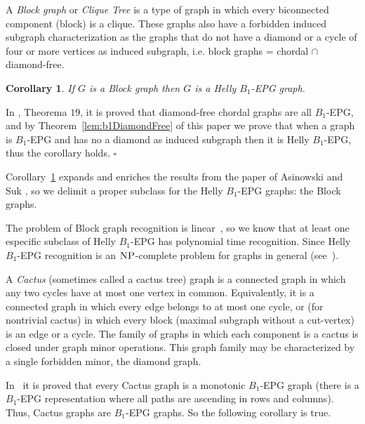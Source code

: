 \documentclass[9pt]{entcs}
\newtheorem{coro}{Corollary}[section]
\begin{document}
A \textit{Block graph} or \textit{Clique Tree} is a type of graph in which every biconnected component (block) is a clique. These graphs also have a forbidden induced subgraph characterization as the graphs that do not have a diamond or a cycle of four or more vertices as induced subgraph, i.e. block graphs = chordal $\cap$ diamond-free.


\begin{coro}\label{lem:cdf}
If $G$ is a Block graph then $G$ is a Helly $B_1$-EPG graph.
\end{coro}

\begin{pf}
In \cite{ries2009}, Theorema $19$, it is proved that diamond-free chordal graphs are all $B_1$-EPG, and by Theorem~\ref{lem:b1DiamondFree} of this paper we prove that when a graph is $B_1$-EPG and has no a diamond as induced subgraph then it is Helly $B_1$-EPG, thus the corollary holds.
 $\square$\end{pf} 

Corollary~\ref{lem:cdf} expands and enriches the results from the paper of Asinowski and Suk \cite{ries2009}, so we delimit a proper subclass for the Helly $B_1$-EPG graphs: the Block graphs.


The problem of Block graph recognition is linear~\cite{tarjan1972depth}, so we know that at least one especific subclass of Helly $B_1$-EPG has polynomial time recognition. Since Helly $B_1$-EPG recognition is an $\textsc{NP}$-complete problem for graphs in general (see~\cite{bornstein2019complexity}).


A \textit{Cactus} (sometimes called a cactus tree)  graph is a connected graph in which any two  cycles have at most one vertex in common. Equivalently, it is a connected graph in which every edge belongs to at most one  cycle, or (for nontrivial cactus) in which every block (maximal subgraph without a cut-vertex) is an edge or a cycle. The family of graphs in which each component is a cactus is closed under graph minor operations. This graph family may be characterized by a single forbidden minor, the diamond graph.
 
 In~\cite{cela2019monotonic} it is proved that every Cactus graph is a monotonic $B_1$-EPG graph (there is a $B_1$-EPG representation where all paths are ascending in rows and columns). Thus, Cactus graphs are $B_1$-EPG graphs. So the following corollary is true. 
 
\end{document}
